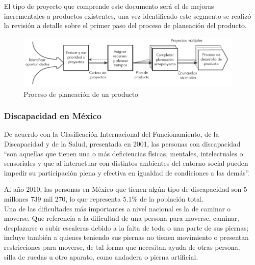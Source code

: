 El tipo de proyecto que comprende este documento ser\'a el de mejoras incrementales a productos existentes, una vez identificado este segmento se realiz\'o la revisi\'on a detalle sobre el primer paso del proceso de planeación del producto.

\begin{figure}[th]
	\centering
	\includegraphics[width=.8\textwidth]{Figures/elproceso.png}
	\decoRule
	\caption{Proceso de planeaci\'on de un producto}
	\label{fig:elproceso}
\end{figure}

\subsubsection{Discapacidad en M\'exico}

De acuerdo con la Clasificaci\'on Internacional del Funcionamiento, de la Discapacidad y de la Salud, presentada en 2001, las personas con discapacidad “son aquellas que tienen una o más deficiencias f\'isicas, mentales, intelectuales o sensoriales y que al interactuar con distintos ambientes del entorno social pueden impedir su participaci\'on plena y efectiva en igualdad de condiciones a las dem\'as”.

Al año 2010, las personas en M\'exico que tienen alg\'un tipo de discapacidad son 5 millones 739 mil 270, lo que representa 5.1\% de la población total.\\
Una de las dificultades m\'as importantes a nivel nacional es la de caminar o moverse. Que referencia a la dificultad de una persona para moverse, caminar, desplazarse o subir escaleras debido a la falta de toda o una parte de sus piernas; incluye tambi\'en a quienes teniendo sus piernas no tienen movimiento o presentan restricciones para moverse, de tal forma que necesitan ayuda de otras persona, silla de ruedas u otro aparato, como andadera o pierna artificial.

